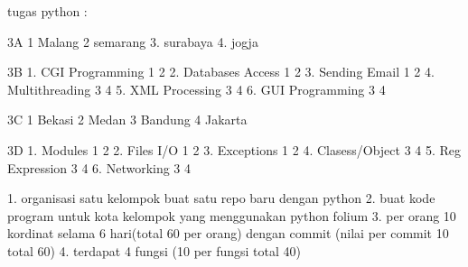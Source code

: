 tugas python :

3A
1 Malang
2 semarang
3. surabaya
4. jogja

3B 
1. CGI Programming 1 2
2. Databases Access 1 2 
3. Sending Email 1 2
4. Multithreading 3 4
5. XML Processing 3 4
6. GUI Programming 3 4

3C
1 Bekasi
2 Medan
3 Bandung
4 Jakarta



3D
1. Modules 1 2
2. Files I/O 1 2 
3. Exceptions 1 2 
4. Clasess/Object 3 4 
5. Reg Expression 3 4 
6. Networking 3 4



1. organisasi satu kelompok buat satu repo baru dengan python
2. buat kode program untuk kota kelompok yang menggunakan python folium
3. per orang 10 kordinat selama 6 hari(total 60 per orang) dengan commit (nilai per commit 10 total 60)
4. terdapat 4 fungsi (10 per fungsi total 40)

